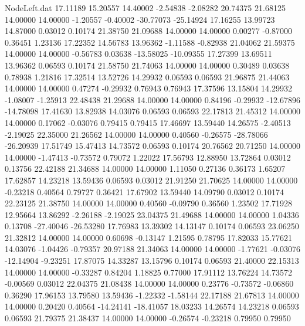 \begin{filecontents}{NodeLeft.dat}
  17.11189   15.20557   14.40002    -2.54838   -2.08282   20.74375   21.68125   14.00000   14.00000   -1.20557   -0.40002  -30.77073  -25.14924
  17.16255   13.99723   14.87000     0.03012    0.10174   21.38750   21.09688   14.00000   14.00000    0.00277   -0.87000    0.36451    1.23136
  17.22352   14.56783   13.96362    -1.11588   -0.82938   21.04062   21.59375   14.00000   14.00000   -0.56783    0.03638  -13.58025  -10.09355
  17.27399   13.69511   13.96362     0.06593    0.10174   21.58750   21.74063   14.00000   14.00000    0.30489    0.03638    0.78938    1.21816
  17.32514   13.52726   14.29932     0.06593    0.06593   21.96875   21.44063   14.00000   14.00000    0.47274   -0.29932    0.76943    0.76943
  17.37596   13.15804   14.29932    -1.08007   -1.25913   22.48438   21.29688   14.00000   14.00000    0.84196   -0.29932  -12.67896  -14.78098
  17.41630   13.82938   14.03076     0.06593    0.06593   22.17813   21.45312   14.00000   14.00000    0.17062   -0.03076    0.79415    0.79415
  17.46697   13.59440   14.26575    -2.40513   -2.19025   22.35000   21.26562   14.00000   14.00000    0.40560   -0.26575  -28.78066  -26.20939
  17.51749   15.47413   14.73572     0.06593    0.10174   20.76562   20.71250   14.00000   14.00000   -1.47413   -0.73572    0.79072    1.22022
  17.56793   12.88950   13.72864     0.03012    0.13756   22.42188   21.34688   14.00000   14.00000    1.11050    0.27136    0.36173    1.65207
  17.62857   14.23218   13.59436     0.06593    0.03012   21.91250   21.70625   14.00000   14.00000   -0.23218    0.40564    0.79727    0.36421
  17.67902   13.59440   14.09790     0.03012    0.10174   22.23125   21.38750   14.00000   14.00000    0.40560   -0.09790    0.36560    1.23502
  17.71928   12.95664   13.86292    -2.26188   -2.19025   23.04375   21.49688   14.00000   14.00000    1.04336    0.13708  -27.40046  -26.53280
  17.76983   13.39302   14.13147     0.10174    0.06593   23.06250   21.32812   14.00000   14.00000    0.60698   -0.13147    1.21595    0.78795
  17.82033   15.77621   14.03076    -1.04426   -0.79357   20.97188   21.34063   14.00000   14.00000   -1.77621   -0.03076  -12.14904   -9.23251
  17.87075   14.33287   13.15796     0.10174    0.06593   21.40000   22.15313   14.00000   14.00000   -0.33287    0.84204    1.18825    0.77000
  17.91112   13.76224   14.73572    -0.00569    0.03012   22.04375   21.08438   14.00000   14.00000    0.23776   -0.73572   -0.06860    0.36290
  17.96153   13.79580   13.59436    -1.22332   -1.58144   22.17188   21.67813   14.00000   14.00000    0.20420    0.40564  -14.24141  -18.41057
  18.03233   14.26574   14.23218     0.06593    0.06593   21.79375   21.38437   14.00000   14.00000   -0.26574   -0.23218    0.79950    0.79950

\end{filecontents}
